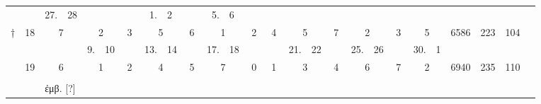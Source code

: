 \begin{tabular}{%
 r  r  r@{~}l r@{~}l r@{~}l r@{~}l r@{~}l r@{~}l
r@{~}l r@{~}l r@{~}l r@{~}l r@{~}l r@{~}l r@{~}l  r r r c
}
     &   &
  27.&28 &    &   &    &   &  1.&2  &    &   &  5.&6  &
  \\
† & 18 &
 \multicolumn{2}{c}{7} & \multicolumn{2}{c}{2} & \multicolumn{2}{c}{3} &
 \multicolumn{2}{c}{5} & \multicolumn{2}{c}{6} & \multicolumn{2}{c}{1} &
 \multicolumn{2}{c}{2} &
 \multicolumn{2}{c}{4} & \multicolumn{2}{c}{5} & \multicolumn{2}{c}{7} &
 \multicolumn{2}{c}{2} & \multicolumn{2}{c}{3} & \multicolumn{2}{c}{5} &
  6586  & 223 & 104 \\
%
\cmidrule{3-31}
  &    &
     &   &  9.&10 &    &   & 13.&14 &    &   & 17.&18 &
     &   &
     &   & 21.&22 &    &   & 25.&26 &    &   & 30.&1  &
  \\
  & 19 &
 \multicolumn{2}{c}{6} & \multicolumn{2}{c}{1} & \multicolumn{2}{c}{2} &
 \multicolumn{2}{c}{4} & \multicolumn{2}{c}{5} & \multicolumn{2}{c}{7} &
 \multicolumn{2}{c}{0} &
 \multicolumn{2}{c}{1} & \multicolumn{2}{c}{3} & \multicolumn{2}{c}{4} &
 \multicolumn{2}{c}{6} & \multicolumn{2}{c}{7} & \multicolumn{2}{c}{2} &
  6940  & 235 & 110 \\
%
\bottomrule
\\
& & \multicolumn{29}{l}{\footnotesize \super{†} \textgreek{ἐμβ. [?]}}\\
\end{tabular}
\caption{%
Tabula Characterismi Neomeniarum Enneadecaeteridis Metonicae
}
